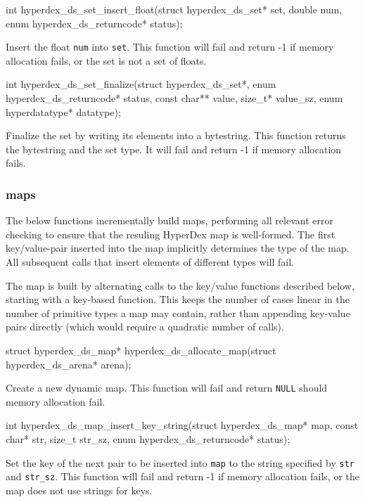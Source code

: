 \funcsep
\begin{ccode}
int hyperdex_ds_set_insert_float(struct hyperdex_ds_set* set, double num,
                                 enum hyperdex_ds_returncode* status);
\end{ccode}
\funcdesc Insert the float \texttt{num} into \texttt{set}.  This function will
fail and return -1 if memory allocation fails, or the set is not a set of
floats.

\funcsep
\begin{ccode}
int hyperdex_ds_set_finalize(struct hyperdex_ds_set*,
                             enum hyperdex_ds_returncode* status,
                             const char** value, size_t* value_sz,
                             enum hyperdatatype* datatype);
\end{ccode}
\funcdesc Finalize the set by writing its elements into a bytestring.  This
function returns the bytestring and the set type.  It will fail and return -1 if
memory allocation fails.

\subsubsection{maps}

The below functions incrementally build maps, performing all relevant error
checking to ensure that the resuling HyperDex map is well-formed.  The first
key/value-pair inserted into the map implicitly determines the type of the map.  All
subsequent calls that insert elements of different types will fail.

The map is built by alternating calls to the key/value functions described
below, starting with a key-based function.  This keeps the number of cases
linear in the number of primitive types a map may contain, rather than appending
key-value pairs directly (which would require a quadratic number of calls).

\begin{ccode}
struct hyperdex_ds_map* hyperdex_ds_allocate_map(struct hyperdex_ds_arena* arena);
\end{ccode}
\funcdesc Create a new dynamic map.  This function will fail and return
\texttt{NULL} should memory allocation fail.

\funcsep
\begin{ccode}
int hyperdex_ds_map_insert_key_string(struct hyperdex_ds_map* map,
                                      const char* str, size_t str_sz,
                                      enum hyperdex_ds_returncode* status);
\end{ccode}
\funcdesc Set the key of the next pair to be inserted into \texttt{map} to the
string specified by \texttt{str} and \texttt{str\_sz}.  This function will fail
and return -1 if memory allocation fails, or the map does not use strings for
keys.

